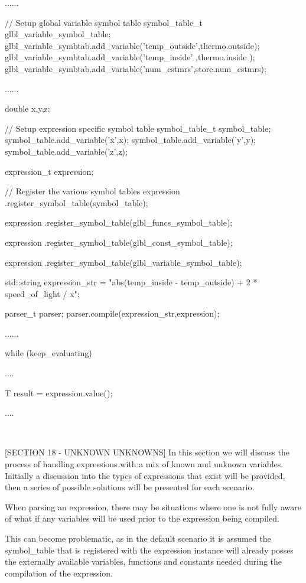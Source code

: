 ......

// Setup global variable symbol table
symbol\_table\_t glbl\_variable\_symbol\_table;
glbl\_variable\_symbtab.add\_variable('temp\_outside',thermo.outside);
glbl\_variable\_symbtab.add\_variable('temp\_inside' ,thermo.inside );
glbl\_variable\_symbtab.add\_variable('num\_cstmrs',store.num\_cstmrs);

......

double x,y,z;

// Setup expression specific symbol table
symbol\_table\_t symbol\_table;
symbol\_table.add\_variable('x',x);
symbol\_table.add\_variable('y',y);
symbol\_table.add\_variable('z',z);

expression\_t expression;

// Register the various symbol tables
expression
.register\_symbol\_table(symbol\_table);

expression
.register\_symbol\_table(glbl\_funcs\_symbol\_table);

expression
.register\_symbol\_table(glbl\_const\_symbol\_table);

expression
.register\_symbol\_table(glbl\_variable\_symbol\_table);

std::string expression\_str =
"abs(temp\_inside - temp\_outside) + 2 * speed\_of\_light / x";

parser\_t parser;
parser.compile(expression\_str,expression);

......

while (keep\_evaluating)
{
....

T result = expression.value();

....
}

~~~~~~~~~~~~~~~~~~~~~~~~~~~~~~~~~~~~~~~~~~~~~~~~~~~~~~~~~~

[SECTION 18 - UNKNOWN UNKNOWNS]
In this section  we will discuss  the process of  handling expressions
with a mix of known and unknown variables. Initially a discussion into
the types of expressions that exist will be provided, then a series of
possible solutions will be presented for each scenario.

When parsing an expression, there  may be situations where one  is not
fully  aware  of what  if  any variables  will  be used  prior  to the
expression being compiled.

This can become problematic, as in the default scenario it is  assumed
the symbol\_table that is registered with the expression instance  will
already  posses  the  externally  available  variables,  functions and
constants needed during the compilation of the expression.

